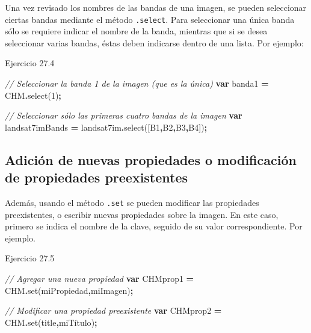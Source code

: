 \documentclass[
  12pt,
  letterpaper,
  twoside]{book}
\newenvironment{Shaded}{\begin{snugshade}}{\end{snugshade}}
\newcommand{\CommentTok}[1]{\textcolor[rgb]{0.56,0.35,0.01}{\textit{#1}}}
\newcommand{\FunctionTok}[1]{\textcolor[rgb]{0.00,0.00,0.00}{#1}}
\newcommand{\KeywordTok}[1]{\textcolor[rgb]{0.13,0.29,0.53}{\textbf{#1}}}
\newcommand{\NormalTok}[1]{#1}
\newcommand{\OperatorTok}[1]{\textcolor[rgb]{0.81,0.36,0.00}{\textbf{#1}}}
\newcommand{\StringTok}[1]{\textcolor[rgb]{0.31,0.60,0.02}{#1}}
\begin{document}
Una vez revisado los nombres de las bandas de una imagen, se pueden seleccionar ciertas bandas mediante el método \texttt{.select}. Para seleccionar una única banda sólo se requiere indicar el nombre de la banda, mientras que si se desea seleccionar varias bandas, éstas deben indicarse dentro de una lista. Por ejemplo:

Ejercicio 27.4

\begin{Shaded}
\begin{Highlighting}[]
\CommentTok{// Seleccionar la banda 1 de la imagen (que es la única)}
\KeywordTok{var}\NormalTok{ banda1 }\OperatorTok{=}\NormalTok{ CHM}\OperatorTok{.}\FunctionTok{select}\NormalTok{(}\StringTok{\textquotesingle{}1\textquotesingle{}}\NormalTok{)}\OperatorTok{;}

\CommentTok{// Seleccionar sólo las primeras cuatro bandas de la imagen}
\KeywordTok{var}\NormalTok{ landsat7imBands }\OperatorTok{=}\NormalTok{ landsat7im}\OperatorTok{.}\FunctionTok{select}\NormalTok{([}\StringTok{\textquotesingle{}B1\textquotesingle{}}\OperatorTok{,}\StringTok{\textquotesingle{}B2\textquotesingle{}}\OperatorTok{,}\StringTok{\textquotesingle{}B3\textquotesingle{}}\OperatorTok{,}\StringTok{\textquotesingle{}B4\textquotesingle{}}\NormalTok{])}\OperatorTok{;}
\end{Highlighting}
\end{Shaded}

\hypertarget{adiciuxf3n-de-nuevas-propiedades-o-modificaciuxf3n-de-propiedades-preexistentes-1}{%
\subsection{Adición de nuevas propiedades o modificación de propiedades preexistentes}\label{adiciuxf3n-de-nuevas-propiedades-o-modificaciuxf3n-de-propiedades-preexistentes-1}}

Además, usando el método \texttt{.set} se pueden modificar las propiedades preexistentes, o escribir nuevas propiedades sobre la imagen. En este caso, primero se indica el nombre de la clave, seguido de su valor correspondiente. Por ejemplo.

Ejercicio 27.5

\begin{Shaded}
\begin{Highlighting}[]
\CommentTok{// Agregar una nueva propiedad}
\KeywordTok{var}\NormalTok{ CHMprop1 }\OperatorTok{=}\NormalTok{ CHM}\OperatorTok{.}\FunctionTok{set}\NormalTok{(}\StringTok{\textquotesingle{}miPropiedad\textquotesingle{}}\OperatorTok{,}\StringTok{\textquotesingle{}miImagen\textquotesingle{}}\NormalTok{)}\OperatorTok{;}

\CommentTok{// Modificar una propiedad preexistente}
\KeywordTok{var}\NormalTok{ CHMprop2 }\OperatorTok{=}\NormalTok{ CHM}\OperatorTok{.}\FunctionTok{set}\NormalTok{(}\StringTok{\textquotesingle{}title\textquotesingle{}}\OperatorTok{,}\StringTok{\textquotesingle{}miTítulo\textquotesingle{}}\NormalTok{)}\OperatorTok{;}
\end{Highlighting}
\end{Shaded}
\end{document}
